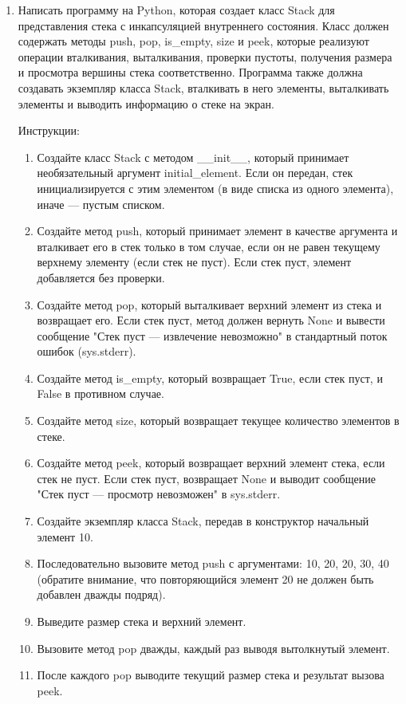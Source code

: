 \begin{enumerate}
    \item Написать программу на Python, которая создает класс Stack для представления стека с инкапсуляцией внутреннего состояния. Класс должен содержать методы push, pop, is\_empty, size и peek, которые реализуют операции вталкивания, выталкивания, проверки пустоты, получения размера и просмотра вершины стека соответственно. Программа также должна создавать экземпляр класса Stack, вталкивать в него элементы, выталкивать элементы и выводить информацию о стеке на экран.

Инструкции:
\begin{enumerate}
    \item Создайте класс Stack с методом \_\_init\_\_, который принимает необязательный аргумент initial\_element. Если он передан, стек инициализируется с этим элементом (в виде списка из одного элемента), иначе — пустым списком.
    \item Создайте метод push, который принимает элемент в качестве аргумента и вталкивает его в стек только в том случае, если он не равен текущему верхнему элементу (если стек не пуст). Если стек пуст, элемент добавляется без проверки.
    \item Создайте метод pop, который выталкивает верхний элемент из стека и возвращает его. Если стек пуст, метод должен вернуть None и вывести сообщение "Стек пуст — извлечение невозможно" в стандартный поток ошибок (sys.stderr).
    \item Создайте метод is\_empty, который возвращает True, если стек пуст, и False в противном случае.
    \item Создайте метод size, который возвращает текущее количество элементов в стеке.
    \item Создайте метод peek, который возвращает верхний элемент стека, если стек не пуст. Если стек пуст, возвращает None и выводит сообщение "Стек пуст — просмотр невозможен" в sys.stderr.
    \item Создайте экземпляр класса Stack, передав в конструктор начальный элемент 10.
    \item Последовательно вызовите метод push с аргументами: 10, 20, 20, 30, 40 (обратите внимание, что повторяющийся элемент 20 не должен быть добавлен дважды подряд).
    \item Выведите размер стека и верхний элемент.
    \item Вызовите метод pop дважды, каждый раз выводя вытолкнутый элемент.
    \item После каждого pop выводите текущий размер стека и результат вызова peek.
\end{enumerate}


\end{enumerate}
